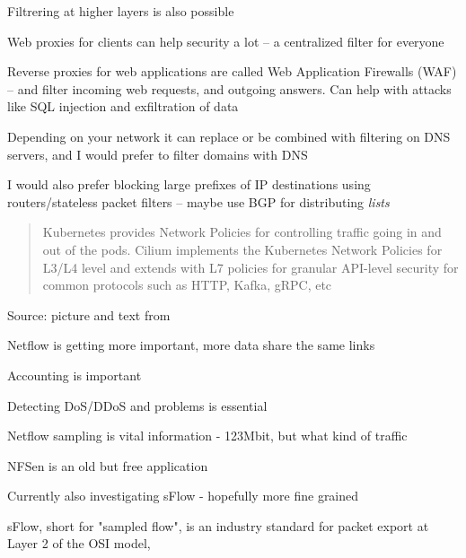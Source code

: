 \documentclass[Screen16to9,17pt]{foils}
\begin{document}
\begin{list2}
\item Filtrering at higher layers is also possible
\item Web proxies for clients can help security a lot -- a centralized filter for everyone

\item Reverse proxies for web applications are called
Web Application Firewalls (WAF) -- and filter incoming web requests, and outgoing answers. Can help with attacks like SQL injection and exfiltration of data
\item Depending on your network it can replace or be combined with filtering on DNS servers, and I would prefer to filter domains with DNS
\item I would also prefer blocking large prefixes of IP destinations using routers/stateless packet filters -- maybe use BGP for distributing \emph{lists}
\end{list2}




\begin{quote}
Kubernetes provides Network Policies for controlling traffic going in and out of the pods. Cilium implements the Kubernetes Network Policies for L3/L4 level and extends with L7 policies for granular API-level security for common protocols such as HTTP, Kafka, gRPC, etc
\end{quote}
Source: picture and text from 







\begin{list2}
\item Netflow is getting more important, more data share the same links
\item Accounting is important
\item Detecting DoS/DDoS and problems is essential
\item Netflow sampling is vital information - 123Mbit, but what kind of traffic
\item NFSen is an old but free application
\item Currently also investigating sFlow - hopefully more fine grained
\item sFlow, short for "sampled flow", is an industry standard for packet export at Layer 2 of the OSI model, \\
\end{list2}
\end{document}
